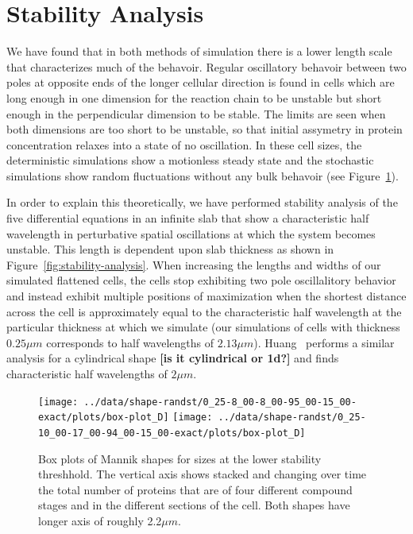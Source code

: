 \documentclass[letterpaper,twocolumn,amsmath,amssymb,pre]{revtex4-1}
\newcommand{\red}[1]{{\bf \color{red} #1}}
\newcommand{\fixme}[1]{\red{[#1]}}
\begin{document}
\section{Stability Analysis}
We have found that in both methods of simulation there is a lower
length scale that characterizes much of the behavoir.  Regular
oscillatory behavoir between two poles at opposite ends of the longer
cellular direction is found in cells which are long enough in one
dimension for the reaction chain to be unstable but short enough in
the perpendicular dimension to be stable.  The limits are seen when
both dimensions are too short to be unstable, so that initial
assymetry in protein concentration relaxes into a state of no
oscillation.  In these cell sizes, the deterministic simulations show
a motionless steady state and the stochastic simulations show random
fluctuations without any bulk behavoir (see Figure~\ref{box-mannik}).

In order to explain this theoretically, we have performed stability
analysis of the five differential equations in an infinite slab that
show a characteristic half wavelength in perturbative spatial
oscillations at which the system becomes unstable.  This length is
dependent upon slab thickness as shown in
Figure~\ref{fig:stability-analysis}.  When increasing the lengths and
widths of our simulated flattened cells, the cells stop exhibiting two
pole oscillalitory behavior and instead exhibit multiple positions of
maximization when the shortest distance across the cell is
approximately equal to the characteristic half wavelength at the
particular thickness at which we simulate (our simulations of cells
with thickness $0.25\mu m$ corresponds to half wavelengths of $2.13\mu
m$).  Huang~\cite{huang2003dynamic} performs a similar analysis for a
cylindrical shape \fixme{is it cylindrical or 1d?} and finds
characteristic half wavelengths of $2\mu m$.

\begin{figure}
  \texttt{[image: ../data/shape-randst/0\_25-8\_00-8\_00-95\_00-15\_00-exact/plots/box-plot\_D]}
  \texttt{[image: ../data/shape-randst/0\_25-10\_00-17\_00-94\_00-15\_00-exact/plots/box-plot\_D]}
  \caption{Box plots of Mannik shapes for sizes at the lower stability
    threshhold.  The vertical axis shows stacked and changing over
    time the total number of proteins that are of four different
    compound stages and in the different sections of the cell.  Both
    shapes have longer axis of roughly 2.2$\mu m$.}
  \label{box-mannik}
\end{figure}
\end{document}
